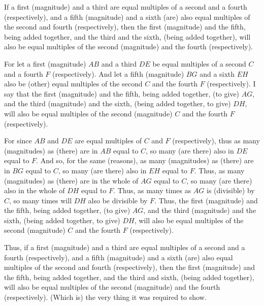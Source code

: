 \begin{Parallel}{}{}
{If a first (magnitude) and a third are equal multiples of a second
and a fourth (respectively), and a fifth (magnitude) and a sixth (are) also equal multiples of the
second and fourth (respectively), then the first (magnitude) and the fifth, being added together, and the third and the sixth,  (being added together), will also be equal multiples of the
second (magnitude) and the fourth (respectively).

For let a first (magnitude) $AB$ and a third $DE$ be equal multiples of a
second $C$ and a fourth $F$ (respectively). And let a fifth (magnitude) $BG$
and a sixth $EH$ also be (other) equal multiples of the second $C$ and the fourth $F$
(respectively). I say that the first (magnitude) and the fifth, being added together, (to give) $AG$,
and the third (magnitude) and the sixth, (being added together, to give) $DH$, will also be
equal multiples of the second (magnitude) $C$ and the fourth $F$ (respectively).

\epsfysize=1.5in
\centerline{}

For since $AB$ and $DE$ are equal multiples of $C$ and $F$ (respectively), 
thus as many (magnitudes) as (there) are in $AB$ equal to $C$, so many (are there) also
in $DE$ equal to $F$.  And so, for the same (reasons),   as many (magnitudes) as (there) are in $BG$ equal to $C$, so many (are there) also in $EH$ equal to $F$.
Thus, as many (magnitudes) as (there) are in the whole of $AG$ equal to $C$,
so many (are there) also in the whole of $DH$ equal to $F$.
Thus, as many times as $AG$ is (divisible) by $C$, so many times will $DH$ also
be divisible by $F$. Thus, the first (magnitude) and the fifth, being
added together, (to give) $AG$, and the third (magnitude) and the sixth, (being
added together, to give) $DH$, will also be equal multiples of the second (magnitude)
$C$ and the fourth $F$ (respectively).

Thus, if a first (magnitude) and a third are equal multiples of a second
and a fourth (respectively), and a fifth (magnitude) and a sixth (are) also equal multiples of the
second and fourth (respectively), then the  first (magnitude) and the fifth, being
added together, and the third  and sixth, (being added together), will also be equal multiples of the
second (magnitude) and the fourth (respectively). (Which is) the very thing it was required to
show.}
\end{Parallel}


\vspace{7pt}{\footnotesize \noindent$^\dag$ In modern notation, this propostion reads
$m\,\alpha+n\,\alpha = (m+n)\,\alpha$.}

